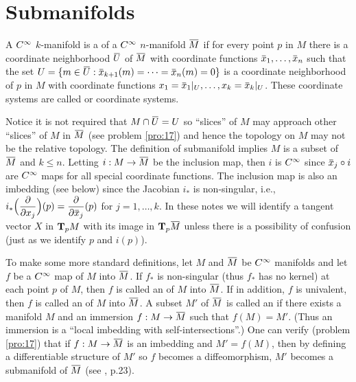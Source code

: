 \documentclass[../main]{subfiles}
\begin{document}

\section{Submanifolds}\label{ch01:s6}

A $\CInfty$ $k$-manifold is a  of a $\CInfty$ $n$-manifold $\xoverline{M}$ if for every point $p$ in $M$ there is a coordinate neighborhood $\xoverline{U}$ of $\xoverline{M}$ with coordinate functions  $\xoverline{x}_1, \dots, \xoverline{x}_n$ such that the set $U = \{m \in \xoverline{U}: \xoverline{x}_{k+1}(m) = \dots = \xoverline{x}_n(m) = 0\}$ is a coordinate neighborhood of $p$ in $M$ with coordinate functions \newline $x_1 = \xoverline{x}_1 |_{U}, \dots ,x_k = \xoverline{x}_k |_{U} $. These coordinate systems are called  or  coordinate systems. 

Notice it is not required that $M \cap \xoverline{U} = U$ so ``slices'' of $M$ may approach other ``slices'' of $M$ in $\xoverline{M}$ (see problem \ref{pro:17}) and hence the topology on $M$ may not be the relative topology. The definition of submanifold implies $M$ is a subset of $\xoverline{M}$ and $k\le n$. Letting $i:M \functionMaps\xoverline{M}$ be the inclusion map, then $i$ is $\CInfty$ since $\xoverline{x}_j\circ i$ are $\CInfty$ maps for all special coordinate functions. The inclusion map is also an imbedding (see below) since the Jacobian $i_*$ is non-singular, i.e., $i_*\Big(\pdv{}{x_j}\Big)(p) = \pdv{}{\xoverline{x}_j}(p)$ for $j = 1,\dots,k$. In these notes we will identify a tangent vector $X$ in $\tangentspace{M}{p}$ with its image in $\tangentspace{\xoverline{M}}{p}$ unless there is a possibility of confusion (just as we identify $p$ and $i(p)$).

To make some more standard definitions, let $M$ and $\xoverline{M}$ be $\CInfty$ manifolds and let $f$ be a $\CInfty$ map of $M$ into $\xoverline{M}$. If $f_*$ is non-singular (thus $f_*$ has no kernel) at each point $p$ of $M$, then $f$ is called an  of $M$ into $\xoverline{M}$. If in addition, $f$ is univalent, then $f$ is called an  of $M$ into $\xoverline{M}$. A subset $M'$ of $\xoverline{M}$ is called an  if there exists a manifold $M$ and an immersion $f: M \functionMaps \xoverline{M}$ such that $f(M) = M'$. (Thus an immersion is a ``local imbedding with self-intersections''.) One can verify (problem \ref{pro:17}) that if $f: M \functionMaps \xoverline{M}$ is an imbedding and $M' = f(M)$, then by defining a differentiable structure of $M'$ so $f$ becomes a diffeomorphism, $M'$ becomes a submanifold of $\xoverline{M}$ (see \cite{helgason2012differential}, p.23).
\end{document}
